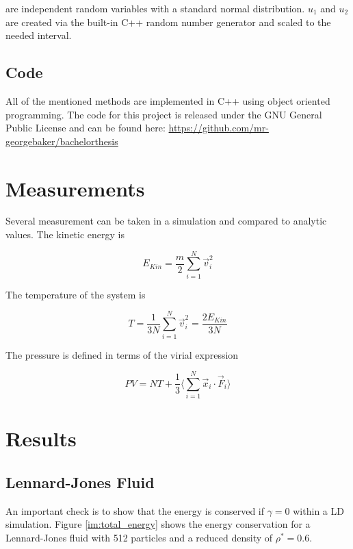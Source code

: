 \documentclass[a4paper]{article}
\begin{document}
are independent random variables with a standard normal distribution. $u_1$ and $u_2$ are created via the built-in C++ random number generator and scaled to the needed interval.

\subsection{Code}

All of the mentioned methods are implemented in C++ using object oriented programming. The code for this project is released under the GNU General Public License and can be found here: \href{https://github.com/mr-georgebaker/bachelorthesis}{https://github.com/mr-georgebaker/bachelorthesis}

\newpage

\section{Measurements}

Several measurement can be taken in a simulation and compared to analytic values. The kinetic energy is

\begin{equation}
E_{Kin} = \frac{m}{2} \sum_{i=1}^N \vec{v}_i^2
\end{equation}

The temperature of the system is

\begin{equation}
T = \frac{1}{3 N} \sum_{i=1}^N \vec{v}_i^2 = \frac{2 E_{Kin}}{3 N}
\end{equation}

The pressure is defined in terms of the virial expression~\cite{M.Doi1988}

\begin{equation}
P V = N T + \frac{1}{3} \Big \langle \sum_{i=1}^N \vec{x}_i \cdot \vec{F}_i \Big \rangle
\end{equation}

\section{Results}
\label{sec:result}

\subsection{Lennard-Jones Fluid}

An important check is to show that the energy is conserved if $\gamma = 0$ within a LD simulation. Figure \ref{im:total_energy} shows the energy conservation for a Lennard-Jones fluid with 512 particles and a reduced density of $\rho^* = 0.6$.
\end{document}
